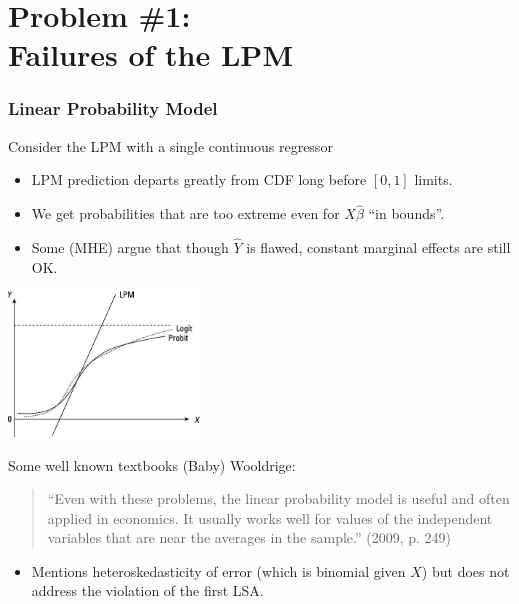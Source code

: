 \documentclass[xcolor=pdftex,dvipsnames,table,mathserif,aspectratio=169]{beamer}
\begin{document}
\section*{Problem \#1:\\
 Failures of the LPM}
\begin{frame}
\frametitle{Linear Probability Model}
Consider the LPM with a single continuous regressor
\begin{itemize}
\item LPM prediction departs greatly from CDF long before $[0,1]$ limits.
\item We get probabilities that are too extreme even for $X\hat{\beta}$ ``in bounds''.
\item Some (MHE) argue that though $\hat{Y}$ is flawed, constant marginal effects are still OK.
\end{itemize}
\begin{center}
\includegraphics[width=2in]{resources/lpm-probit.jpg}
\end{center}
\end{frame}

\begin{frame}{Some well known textbooks}
(Baby) Wooldrige:
\begin{quote}
``Even with these problems, the linear probability model is useful and often applied in economics. It usually works well for values of the independent variables that are near the averages in the sample.'' (2009, p. 249)
\end{quote}
\begin{itemize}
\item Mentions heteroskedasticity of error (which is binomial given $X$) but does not address the violation of the first LSA.
\end{itemize}
\end{frame}
\end{document}
